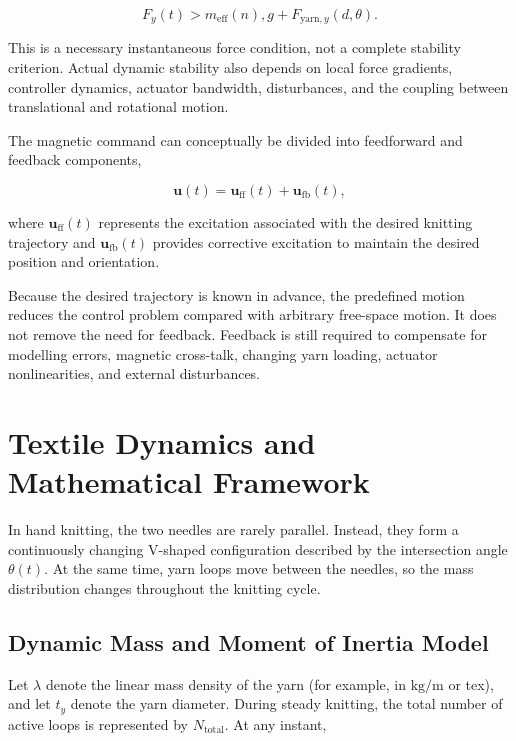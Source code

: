 \documentclass[12pt, a4paper]{article}
\begin{document}
\begin{equation}
F_y(t) >
m_{\text{eff}}(n),g
+
F_{\text{yarn},y}(d,\theta).
\end{equation}

This is a necessary instantaneous force condition, not a complete stability criterion. Actual dynamic stability also depends on local force gradients, controller dynamics, actuator bandwidth, disturbances, and the coupling between translational and rotational motion.

The magnetic command can conceptually be divided into feedforward and feedback components,

\begin{equation}
\mathbf{u}(t)=
\mathbf{u}_{\mathrm{ff}}(t)+
\mathbf{u}_{\mathrm{fb}}(t),
\end{equation}

where $\mathbf{u}_{\mathrm{ff}}(t)$ represents the excitation associated with the desired knitting trajectory and $\mathbf{u}_{\mathrm{fb}}(t)$ provides corrective excitation to maintain the desired position and orientation.

Because the desired trajectory is known in advance, the predefined motion reduces the control problem compared with arbitrary free-space motion. It does not remove the need for feedback. Feedback is still required to compensate for modelling errors, magnetic cross-talk, changing yarn loading, actuator nonlinearities, and external disturbances.

\section{Textile Dynamics and Mathematical Framework}

In hand knitting, the two needles are rarely parallel. Instead, they form a continuously changing V-shaped configuration described by the intersection angle $\theta(t)$. At the same time, yarn loops move between the needles, so the mass distribution changes throughout the knitting cycle.

\subsection{Dynamic Mass and Moment of Inertia Model}

Let $\lambda$ denote the linear mass density of the yarn (for example, in $\mathrm{kg/m}$ or tex), and let $t_y$ denote the yarn diameter. During steady knitting, the total number of active loops is represented by $N_{\text{total}}$. At any instant,
\end{document}
